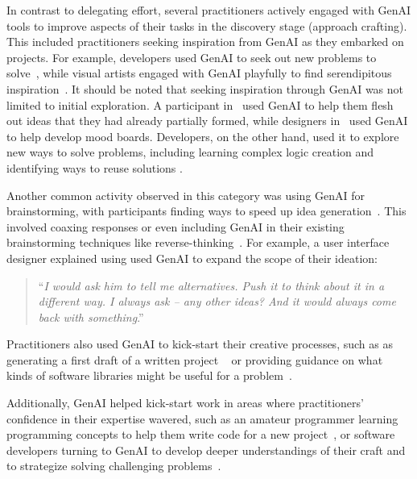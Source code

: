 In contrast to delegating effort, several practitioners actively engaged with GenAI tools to improve aspects of their tasks in the discovery stage (approach crafting). This included practitioners seeking inspiration from GenAI as they embarked on projects. For example, developers used GenAI to seek out new problems to solve~\cite{4}, while visual artists engaged with GenAI playfully to find serendipitous inspiration~\cite{9}. It should be noted that seeking inspiration through GenAI was not limited to initial exploration. A participant in~\cite{6} used GenAI to help them flesh out ideas that they had already partially formed, while designers in~\cite{6,18} used GenAI to help develop mood boards. Developers, on the other hand, used it to explore new ways to solve problems, including learning complex logic creation and identifying ways to reuse solutions \cite{4}.

Another common activity observed in this category was using GenAI for brainstorming, with participants finding ways to speed up idea generation~\cite{10}. This involved coaxing responses or even including GenAI in their existing brainstorming techniques like reverse-thinking~\cite{21}. For example, a user interface designer \cite{6} explained using used GenAI to expand the scope of their ideation:   

\begin{quote}
    ``\textit{I would ask him to tell me alternatives. Push it to think about it in a different way. I always ask – any other ideas? And it would always come back with something}.''
\end{quote}

Practitioners also used GenAI to kick-start their creative processes, such as as generating a first draft of a written project ~\cite{10} or providing guidance on what kinds of software libraries might be useful for a problem~\cite{12}. 



Additionally, GenAI helped kick-start work in areas where practitioners' confidence in their expertise wavered, such as an amateur programmer learning programming concepts to help them write code for a new project~\cite{6}, or software developers turning to GenAI to develop deeper understandings of their craft and to strategize solving challenging problems~\cite{16}.

